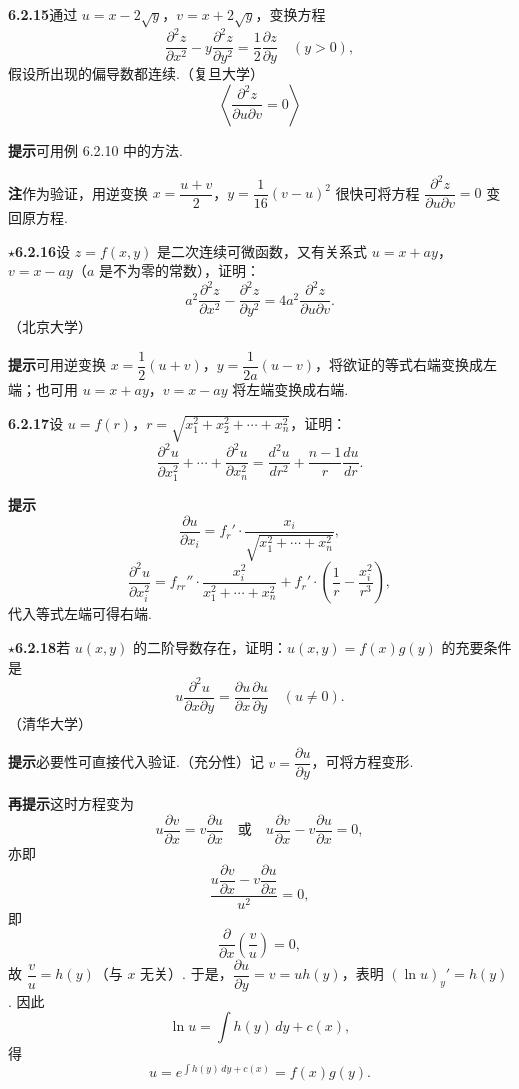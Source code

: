 \documentclass[UTF8,12pt,a4paper,fontset=fandol]{ctexart}
\begin{document}
\noindent\textbf{6.2.15}\quad 通过 $u=x-2\sqrt y$，$v=x+2\sqrt y$，变换方程
\[
  \frac{\partial^2z}{\partial x^2}-y\frac{\partial^2z}{\partial y^2}
  =\frac12\frac{\partial z}{\partial y}\quad (y>0),
\]
假设所出现的偏导数都连续.（复旦大学）
\[
  \left\langle \frac{\partial^2z}{\partial u\partial v}=0\right\rangle
\]

\noindent\textbf{提示}\quad 可用例 6.2.10 中的方法.

\noindent\textbf{注}\quad 作为验证，用逆变换 $x=\dfrac{u+v}{2}$，$y=\dfrac1{16}(v-u)^2$ 很快可将方程 $\dfrac{\partial^2z}{\partial u\partial v}=0$ 变回原方程.

\noindent\textbf{\ensuremath{\star}6.2.16}\quad 设 $z=f(x,y)$ 是二次连续可微函数，又有关系式 $u=x+ay$，$v=x-ay$（$a$ 是不为零的常数），证明：
\[
  a^2\frac{\partial^2z}{\partial x^2}-\frac{\partial^2z}{\partial y^2}
  =4a^2\frac{\partial^2z}{\partial u\partial v}.
\]
（北京大学）

\noindent\textbf{提示}\quad 可用逆变换 $x=\dfrac12(u+v)$，$y=\dfrac1{2a}(u-v)$，将欲证的等式右端变换成左端；也可用 $u=x+ay$，$v=x-ay$ 将左端变换成右端.

\noindent\textbf{6.2.17}\quad 设 $u=f(r)$，$r=\sqrt{x_1^2+x_2^2+\cdots+x_n^2}$，证明：
\[
  \frac{\partial^2u}{\partial x_1^2}+\cdots+\frac{\partial^2u}{\partial x_n^2}
  =\frac{d^2u}{dr^2}+\frac{n-1}{r}\frac{du}{dr}.
\]

\noindent\textbf{提示}\quad
\[
  \frac{\partial u}{\partial x_i}=f_r'\cdot\frac{x_i}{\sqrt{x_1^2+\cdots+x_n^2}},
\]
\[
  \frac{\partial^2u}{\partial x_i^2}
  =f_{rr}''\cdot\frac{x_i^2}{x_1^2+\cdots+x_n^2}
  +f_r'\cdot\left(\frac1r-\frac{x_i^2}{r^3}\right),
\]
代入等式左端可得右端.

\noindent\textbf{\ensuremath{\star}6.2.18}\quad 若 $u(x,y)$ 的二阶导数存在，证明：$u(x,y)=f(x)g(y)$ 的充要条件是
\[
  u\frac{\partial^2u}{\partial x\partial y}
  =\frac{\partial u}{\partial x}\frac{\partial u}{\partial y}\quad(u\ne0).
\]
（清华大学）

\noindent\textbf{提示}\quad 必要性可直接代入验证.（充分性）记 $v=\dfrac{\partial u}{\partial y}$，可将方程变形.

\noindent\textbf{再提示}\quad 这时方程变为
\[
  u\frac{\partial v}{\partial x}=v\frac{\partial u}{\partial x}
  \quad\text{或}\quad
  u\frac{\partial v}{\partial x}-v\frac{\partial u}{\partial x}=0,
\]
亦即
\[
  \frac{u\dfrac{\partial v}{\partial x}-v\dfrac{\partial u}{\partial x}}{u^2}=0,
\]
即
\[
  \frac{\partial}{\partial x}\left(\frac vu\right)=0,
\]
故 $\dfrac vu=h(y)$（与 $x$ 无关）. 于是，$\dfrac{\partial u}{\partial y}=v=uh(y)$，表明 $(\ln u)_y'=h(y)$. 因此
\[
  \ln u=\int h(y)\,dy+c(x),
\]
得
\[
  u=e^{\int h(y)\,dy+c(x)}=f(x)g(y).
\]
\end{document}
